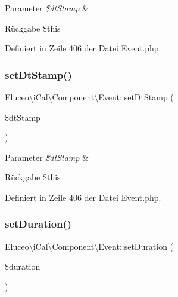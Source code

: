 \begin{DoxyParams}{Parameter}
{\em \$dt\+Stamp} & \\
\hline
\end{DoxyParams}
\begin{DoxyReturn}{Rückgabe}
\$this 
\end{DoxyReturn}


Definiert in Zeile 406 der Datei Event.\+php.

\mbox{\label{class_eluceo_1_1i_cal_1_1_component_1_1_event_a395b6bc368752cb4f2dbe0fac3b4bc8f}} 
\subsubsection{\texorpdfstring{set\+Dt\+Stamp()}{setDtStamp()}\hspace{0.1cm}{\footnotesize\ttfamily [3/3]}}
{\footnotesize\ttfamily Eluceo\textbackslash{}i\+Cal\textbackslash{}\+Component\textbackslash{}\+Event\+::set\+Dt\+Stamp (\begin{DoxyParamCaption}\item[{}]{\$dt\+Stamp }\end{DoxyParamCaption})}


\begin{DoxyParams}{Parameter}
{\em \$dt\+Stamp} & \\
\hline
\end{DoxyParams}
\begin{DoxyReturn}{Rückgabe}
\$this 
\end{DoxyReturn}


Definiert in Zeile 406 der Datei Event.\+php.

\mbox{\label{class_eluceo_1_1i_cal_1_1_component_1_1_event_aaa4ee424e98d66778e0af4c7c0e4994f}} 
\subsubsection{\texorpdfstring{set\+Duration()}{setDuration()}\hspace{0.1cm}{\footnotesize\ttfamily [1/3]}}
{\footnotesize\ttfamily Eluceo\textbackslash{}i\+Cal\textbackslash{}\+Component\textbackslash{}\+Event\+::set\+Duration (\begin{DoxyParamCaption}\item[{}]{\$duration }\end{DoxyParamCaption})}


